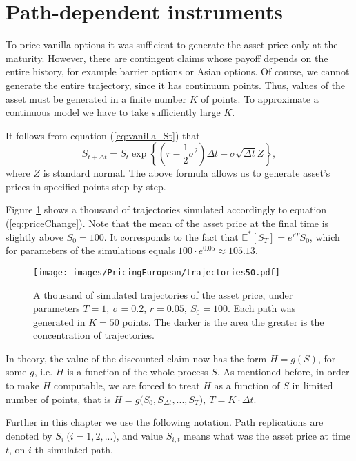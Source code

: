 \documentclass[a4paper,11pt, twoside]{book}
\theoremstyle{definition}
\theoremstyle{remark}
\newcounter{example}[chapter]
\def\Em{{\mathbb{E}^*}}
\begin{document}
\newpage
\section{Path-dependent instruments}
\label{sec:pricing_complicated}

To price vanilla options it was sufficient to generate the asset price only at the maturity. However, there are contingent claims whose payoff depends on the entire history, for example barrier options or Asian options. Of course, we cannot generate the entire trajectory, since it has continuum points. Thus, values of the asset must be generated in a finite number $K$ of points. To approximate a continuous model we have to take sufficiently large $K$.

It follows from equation (\ref{eq:vanilla_St}) that
\begin{equation}
 \label{eq:priceChange}
 S_{t + {\Delta} t} = S_t \exp\left\{ (r - \frac{1}{2}\sigma^2)\Delta t + \sigma \sqrt{\Delta t} Z \right\},
\end{equation}
where $Z$ is standard normal. The above formula allows us to generate asset's prices in specified points step by step.

Figure \ref{fig:trajectories} shows a thousand of trajectories simulated accordingly to equation (\ref{eq:priceChange}). Note that the mean of the asset price at the final time is slightly above $S_0 = 100$. It corresponds to the fact that $\Em [S_T] = e^{rT}S_0$, which for parameters of the simulations equals $100\cdot e^{0.05} \approx 105.13$.

\begin{figure}[h]
\centering
 \texttt{[image: images/PricingEuropean/trajectories50.pdf]}
\caption{A thousand of simulated trajectories of the asset price, under parameters ${T=1},\ {\sigma=0.2}$, ${r=0.05},\ {S_0=100}$. Each path was generated in $K=50$ points. The darker is the area the greater is the concentration of trajectories.}
\label{fig:trajectories}
\end{figure}

In theory, the value of the discounted claim now has the form $H = g(S)$, for some $g$, i.e. $H$ is a function of the whole process $S$. As mentioned before, in order to make $H$ computable, we are forced to treat $H$ as a function of $S$ in limited number of points, that is $H = g\bigl(S_0, S_{\Delta t}, ..., S_T\bigr),\ T = K\cdot\Delta t$.

Further in this chapter we use the following notation. Path replications are denoted by $S_i\ (i=1,2,...$), and value $S_{i,t}$ means what was the asset price at time $t$, on $i$-th simulated path.
\end{document}
